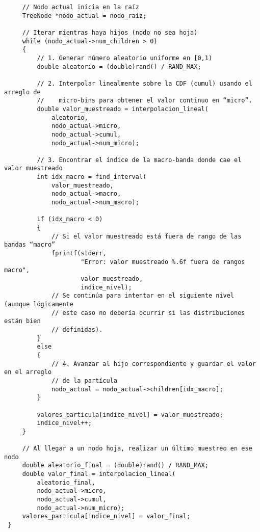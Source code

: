 \begin{verbatim}
     // Nodo actual inicia en la raíz
     TreeNode *nodo_actual = nodo_raíz;
 
     // Iterar mientras haya hijos (nodo no sea hoja)
     while (nodo_actual->num_children > 0)
     {
         // 1. Generar número aleatorio uniforme en [0,1)
         double aleatorio = (double)rand() / RAND_MAX;
 
         // 2. Interpolar linealmente sobre la CDF (cumul) usando el arreglo de 
         //    micro-bins para obtener el valor continuo en “micro”.
         double valor_muestreado = interpolacion_lineal(
             aleatorio,
             nodo_actual->micro,
             nodo_actual->cumul,
             nodo_actual->num_micro);
 
         // 3. Encontrar el índice de la macro-banda donde cae el valor muestreado
         int idx_macro = find_interval(
             valor_muestreado,
             nodo_actual->macro,
             nodo_actual->num_macro);
 
         if (idx_macro < 0)
         {
             // Si el valor muestreado está fuera de rango de las bandas “macro”
             fprintf(stderr,
                     "Error: valor muestreado %.6f fuera de rangos macro",
                     valor_muestreado,
                     indice_nivel);
             // Se continúa para intentar en el siguiente nivel (aunque lógicamente
             // este caso no debería ocurrir si las distribuciones están bien 
             // definidas).
         }
         else
         {
             // 4. Avanzar al hijo correspondiente y guardar el valor en el arreglo 
             // de la partícula
             nodo_actual = nodo_actual->children[idx_macro];
         }
 
         valores_particula[indice_nivel] = valor_muestreado;
         indice_nivel++;
     }
 
     // Al llegar a un nodo hoja, realizar un último muestreo en ese nodo
     double aleatorio_final = (double)rand() / RAND_MAX;
     double valor_final = interpolacion_lineal(
         aleatorio_final,
         nodo_actual->micro,
         nodo_actual->cumul,
         nodo_actual->num_micro);
     valores_particula[indice_nivel] = valor_final;
 }
\end{verbatim}

